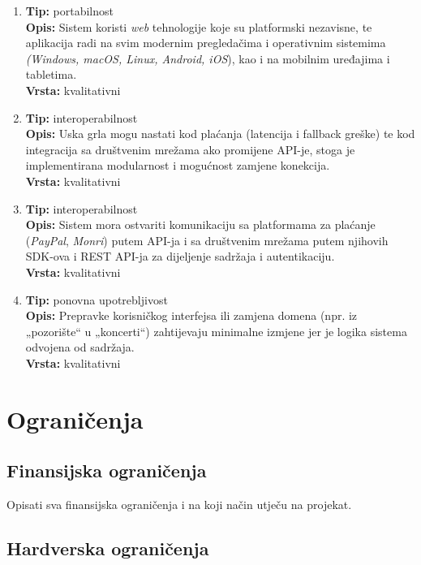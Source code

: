 \begin{enumerate}
    \item\textbf{Tip:} portabilnost\\
    \textbf{Opis:} Sistem koristi \textit{web} tehnologije koje su platformski nezavisne, te aplikacija radi na svim modernim pregledačima i operativnim sistemima \textit{(Windows, macOS, Linux, Android, iOS}), kao i na mobilnim uređajima i tabletima.\\
    \textbf{Vrsta:} kvalitativni
    \item\textbf{Tip:} interoperabilnost\\
    \textbf{Opis:} Uska grla mogu nastati kod plaćanja (latencija i fallback greške) te kod integracija sa društvenim mrežama ako promijene API-je, stoga je implementirana modularnost i mogućnost zamjene konekcija.\\
    \textbf{Vrsta:} kvalitativni
    \item\textbf{Tip:} interoperabilnost\\
    \textbf{Opis:} Sistem mora ostvariti komunikaciju sa platformama za plaćanje (\textit{PayPal}, \textit{Monri}) putem API-ja i sa društvenim mrežama putem njihovih SDK-ova i REST API-ja za dijeljenje sadržaja i autentikaciju.\\
    \textbf{Vrsta:} kvalitativni
    \item\textbf{Tip:} ponovna upotrebljivost\\
    \textbf{Opis:} Prepravke korisničkog interfejsa ili zamjena domena (npr. iz „pozorište“ u „koncerti“) zahtijevaju minimalne izmjene jer je logika sistema odvojena od sadržaja.\\
    \textbf{Vrsta:} kvalitativni
\end{enumerate}

\sloppy
\section{Ograničenja}

\sloppy
\subsection{Finansijska ograničenja}

Opisati sva finansijska ograničenja i na koji način utječu na projekat.

\sloppy
\subsection{Hardverska ograničenja}

